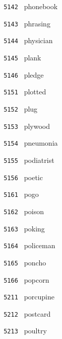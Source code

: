 \documentclass[11pt]{article}
\begin{document}
\begin{multicols}{6}
\noindent \texttt{ 5142 } \hspace{1mm} phonebook  \par
\noindent \texttt{ 5143 } \hspace{1mm} phrasing  \par
\noindent \texttt{ 5144 } \hspace{1mm} physician  \par
\noindent \texttt{ 5145 } \hspace{1mm} plank  \par
\noindent \texttt{ 5146 } \hspace{1mm} pledge  \par
\noindent \texttt{ 5151 } \hspace{1mm} plotted  \par
\noindent \texttt{ 5152 } \hspace{1mm} plug  \par
\noindent \texttt{ 5153 } \hspace{1mm} plywood  \par
\noindent \texttt{ 5154 } \hspace{1mm} pneumonia  \par
\noindent \texttt{ 5155 } \hspace{1mm} podiatrist  \par
\noindent \texttt{ 5156 } \hspace{1mm} poetic  \par
\noindent \texttt{ 5161 } \hspace{1mm} pogo  \par
\noindent \texttt{ 5162 } \hspace{1mm} poison  \par
\noindent \texttt{ 5163 } \hspace{1mm} poking  \par
\noindent \texttt{ 5164 } \hspace{1mm} policeman  \par
\noindent \texttt{ 5165 } \hspace{1mm} poncho  \par
\noindent \texttt{ 5166 } \hspace{1mm} popcorn  \par
\noindent \texttt{ 5211 } \hspace{1mm} porcupine  \par
\noindent \texttt{ 5212 } \hspace{1mm} postcard  \par
\noindent \texttt{ 5213 } \hspace{1mm} poultry  \par

\end{multicols}
\end{document}
